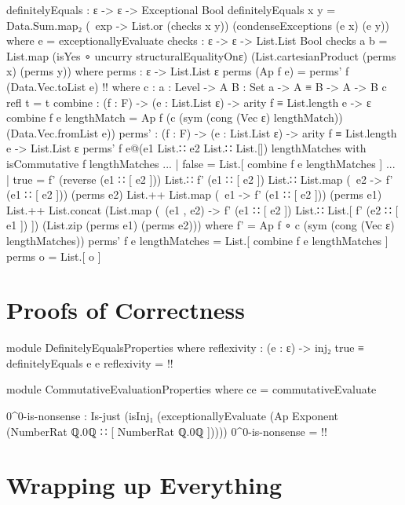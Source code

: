 \documentclass{report}
\begin{document}
\begin{code}
definitelyEquals : ε -> ε -> Exceptional Bool
definitelyEquals x y = Data.Sum.map₂ (\ exp -> List.or (checks x y))
                                     (condenseExceptions (e x) (e y))
  where
  e = exceptionallyEvaluate
  checks : ε -> ε -> List.List Bool
  checks a b = List.map (isYes ∘ uncurry structuralEqualityOnε)
                        (List.cartesianProduct (perms x) (perms y))
    where
    perms : ε -> List.List ε
    perms (Ap f e) = perms' f (Data.Vec.toList e) {!!}
      where
      c : {a : Level} ->
          {A B : Set a} ->
          A ≡ B ->
          A -> B
      c refl t = t
      combine : (f : F) -> (e : List.List ε) -> arity f ≡ List.length e -> ε
      combine f e lengthMatch = Ap f (c (sym (cong (Vec ε) lengthMatch))
                                        (Data.Vec.fromList e))
      perms' : (f : F) -> (e : List.List ε) -> arity f ≡ List.length e -> List.List ε
      perms' f e@(e1 List.∷ e2 List.∷ List.[]) lengthMatches with isCommutative f lengthMatches
      ... | false = List.[ combine f e lengthMatches ]
      ... | true =
        f' (reverse (e1 ∷ [ e2 ])) List.∷ f' (e1 ∷ [ e2 ]) List.∷
        List.map (\ e2 -> f' (e1 ∷ [ e2 ])) (perms e2) List.++
        List.map (\ e1 -> f' (e1 ∷ [ e2 ])) (perms e1) List.++
        List.concat (List.map (\ (e1 , e2) -> f' (e1 ∷ [ e2 ]) List.∷
                                              List.[ f' (e2 ∷ [ e1 ]) ])
                              (List.zip (perms e1) (perms e2)))
        where
        f' = Ap f ∘ c (sym (cong (Vec ε) lengthMatches))
      perms' f e lengthMatches = List.[ combine f e lengthMatches ]
    perms o = List.[ o ]
\end{code}

\chapter{Proofs of Correctness}

\begin{code}
module DefinitelyEqualsProperties where
  reflexivity : (e : ε) -> inj₂ true ≡ definitelyEquals e e
  reflexivity = {!!}

module CommutativeEvaluationProperties where
  ce = commutativeEvaluate

  0^0-is-nonsense :
    Is-just (isInj₁ (exceptionallyEvaluate
      (Ap Exponent (NumberRat ℚ.0ℚ ∷ [ NumberRat ℚ.0ℚ ]))))
  0^0-is-nonsense = {!!}
\end{code}

\chapter{Wrapping up Everything}
\end{document}
